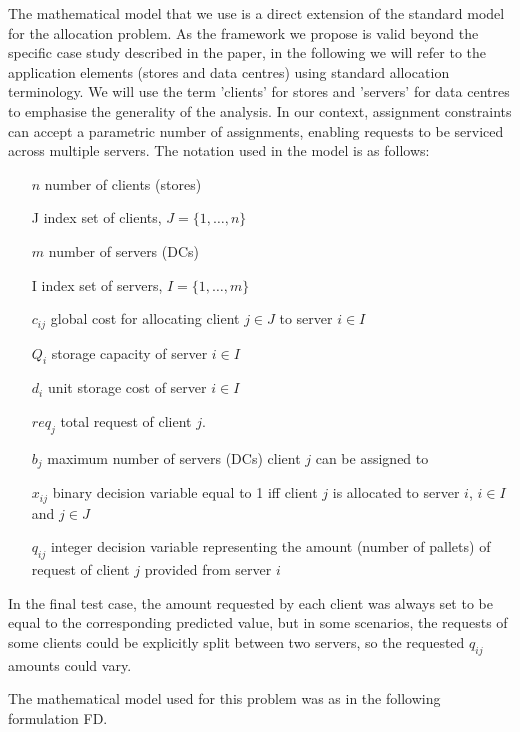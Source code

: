 \documentclass[ijoc,sglanonrev]{informs4}
\begin{document}
The mathematical model that we use is a direct extension of the standard model for the allocation problem. As the framework we propose is valid beyond the specific case study described in the paper, in the following we will refer to the application elements (stores and data centres) using standard allocation terminology. We will use the term 'clients' for stores and 'servers' for data centres to emphasise the generality of the analysis. In our context, assignment constraints can accept a parametric number of assignments, enabling requests to be serviced across multiple servers. The notation used in the model is as follows:

\begin{enumerate}
    \item[$n$] number of clients (stores)
    \item[J] index set of clients, $J=\{1, \ldots, n\}$
    \item[$m$] number of servers (DCs)
    \item[I] index set of servers, $I=\{1, \ldots, m\}$
    \item[$c_{ij}$] global cost for allocating client $j \in J$ to server $i \in I$
    \item[$Q_i$] storage capacity of server $i \in I$
    \item[$d_i$] unit storage cost of server $i \in I$
    \item[$req_j$] total request of client $j$.
    \item[$b_j$] maximum number of servers (DCs) client $j$ can be assigned to
    \item[$x_{ij}$] binary decision variable equal to 1 iff client $j$ is allocated to server $i$, $i \in I$ and $j \in J$
    \item[$q_{ij}$] integer decision variable representing the amount (number of pallets) of request of client $j$ provided from server $i$
\end{enumerate}

In the final test case, the amount requested by each client was always set to be equal to the corresponding predicted value, but in some scenarios, the requests of some clients could be explicitly split between two servers, so the requested $q_{ij}$ amounts could vary.

The mathematical model used for this problem was as in the following formulation FD.
   
\end{document}
